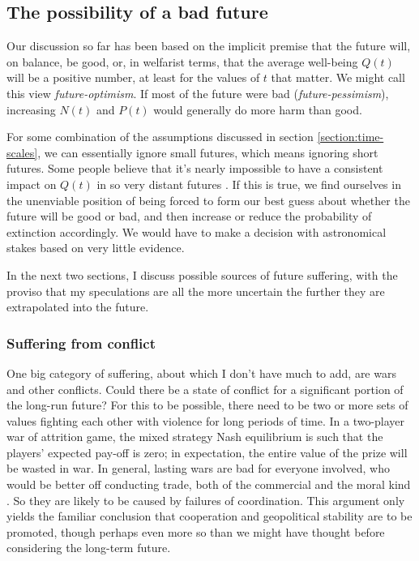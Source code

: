 \documentclass[british]{article}
\begin{document}
\subsection{The possibility of a bad future} Our discussion so far has been based on the implicit premise that the future will, on balance, be good, or, in welfarist terms, that the average well-being \(Q(t)\) will be a positive number, at least for the values of \(t\) that matter. We might call this view \emph{future-optimism}. If most of the future were bad (\emph{future-pessimism}), increasing \(N(t)\) and \(P(t)\) would generally do more harm than good.

For some combination of the assumptions discussed in section \ref{section:time-scales}, we can essentially ignore small futures, which means ignoring short futures. Some people believe that it's nearly impossible to have a consistent impact on $Q(t)$ in so very distant futures \citep[Section II]{lenman_consequentialism_2000}. If this is true, we find ourselves in the unenviable position of being forced to form our best guess about whether the future will be good or bad, and then increase or reduce the probability of extinction accordingly. We would have to make a decision with astronomical stakes based on very little evidence.

In the next two sections, I discuss possible sources of future suffering, with the proviso that my speculations are all the more uncertain the further they are extrapolated into the future.

\subsubsection{Suffering from conflict}\label{war}
One big category of suffering, about which I don't have much to add, are wars and other conflicts. Could there be a state of conflict for a significant portion of the long-run future? For this to be possible, there need to be two or more sets of values fighting each other with violence for long periods of time. In a two-player war of attrition game, the mixed strategy Nash equilibrium is such that the players' expected pay-off is zero; in expectation, the entire value of the prize will be wasted in war. In general, lasting wars are bad for everyone involved, who would be better off conducting trade, both of the commercial and the moral kind \citep{tomasik_gains_2013,ord_moral_2015}. So they are likely to be caused by failures of coordination. This argument only yields the familiar conclusion that cooperation and geopolitical stability are to be promoted, though perhaps even more so than we might have thought before considering the long-term future.
\end{document}
